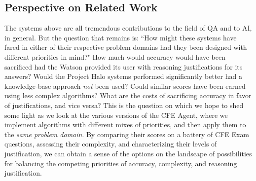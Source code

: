 \subsection{Perspective on Related Work}

The systems above are all tremendous contributions to the field of QA and to AI, in general.  But the question that remains is: ``How might these systems have fared in either of their respective problem domains had they been designed with different priorities in mind?"  How much would accuracy would have been sacrificed had the Watson provided its user with reasoning justifications for its answers?  Would the Project Halo systems performed significantly better had a knowledge-base approach \emph{not} been used?  Could similar scores have been earned using less complex algorithms?  What are the costs of sacrificing accuracy in favor of justifications, and vice versa?  This is the question on which we hope to shed some light as we look at the various versions of the CFE Agent, where we implement algorithms with different mixes of priorities, and then apply them to the \emph{same problem domain}.  By comparing their scores on a battery of CFE Exam questions, assessing their complexity,  and characterizing their levels of justification, we can obtain a sense of the options on the landscape of possibilities for balancing the competing priorities of accuracy, complexity, and reasoning justification.









